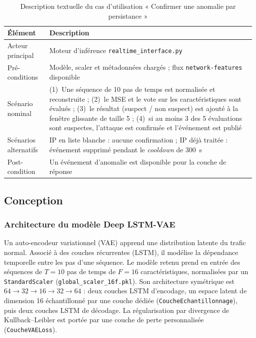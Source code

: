 \begin{table}[H]
\centering
\caption{Description textuelle du cas d'utilisation « Confirmer une anomalie par persistance »}
\label{tab:uc-s2-persistance}
\small
\begin{tabularx}{\textwidth}{@{}lX@{}}
\toprule
\textbf{Élément} & \textbf{Description} \\
\midrule
Acteur principal & Moteur d'inférence \texttt{realtime\_interface.py} \\
Pré-conditions & Modèle, scaler et métadonnées chargés ; flux \texttt{network-features} disponible \\
Scénario nominal & (1)~Une séquence de 10 pas de temps est normalisée et reconstruite ; (2)~le MSE et le vote sur les caractéristiques sont évalués ; (3)~le résultat (suspect / non suspect) est ajouté à la fenêtre glissante de taille 5 ; (4)~si au moins 3 des 5 évaluations sont suspectes, l'attaque est confirmée et l'événement est publié \\
Scénarios alternatifs & IP en liste blanche : aucune confirmation ; IP déjà traitée : événement supprimé pendant le \emph{cooldown} de \SI{300}{\second} \\
Post-condition & Un événement d'anomalie est disponible pour la couche de réponse \\
\bottomrule
\end{tabularx}
\end{table}

\subsection{Conception}

\subsubsection{Architecture du modèle Deep LSTM-VAE}
\label{sec:archi-lstm-vae}

Un auto-encodeur variationnel (VAE) apprend une distribution latente du trafic normal. Associé à des couches récurrentes (LSTM), il modélise la dépendance temporelle entre les pas d'une séquence. Le modèle retenu prend en entrée des séquences de $T=10$ pas de temps de $F=16$ caractéristiques, normalisées par un \texttt{StandardScaler} (\texttt{global\_scaler\_16f.pkl}). Son architecture symétrique est $64 \rightarrow 32 \rightarrow 16 \rightarrow 32 \rightarrow 64$ : deux couches LSTM d'encodage, un espace latent de dimension 16 échantillonné par une couche dédiée (\texttt{CoucheEchantillonnage}), puis deux couches LSTM de décodage. La régularisation par divergence de Kullback--Leibler est portée par une couche de perte personnalisée (\texttt{CoucheVAELoss}).

